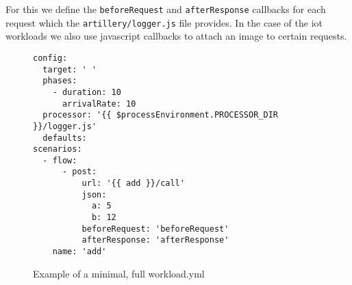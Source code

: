 \documentclass[../main.tex]{subfiles}
\begin{document}
For this we define the \texttt{beforeRequest} and \texttt{afterResponse} callbacks for each request which the \texttt{artillery/logger.js} file provides.
In the case of the iot workloads we also use javascript callbacks to attach an image to certain requests.

\begin{figure}[H]
  \begin{tcolorbox}[titleDetachedStyle, title=\texttt{workload.yml}]
  \begin{verbatim}
config:
  target: ' '
  phases:
    - duration: 10
      arrivalRate: 10
  processor: '{{ $processEnvironment.PROCESSOR_DIR }}/logger.js'
  defaults:
scenarios:
  - flow:
      - post:
          url: '{{ add }}/call'
          json:
            a: 5
            b: 12
          beforeRequest: 'beforeRequest'
          afterResponse: 'afterResponse'
    name: 'add'
\end{verbatim}
\end{tcolorbox}
\caption{Example of a minimal, full workload.yml}%
\label{fig:exampleWorkloadYML}
\end{figure}
\end{document}
